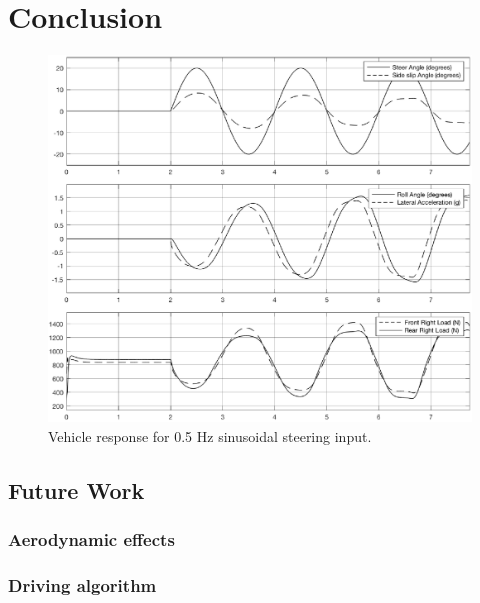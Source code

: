 \chapter{Conclusion}
\label{chap:conclusion}

\begin{figure}[ht]
  \centering
  \includegraphics[scale=0.8]{figures/sine}
  \caption{Vehicle response for 0.5 Hz sinusoidal steering input.}
  \label{sine}
\end{figure}
\section{Future Work}
\label{sec:future}
\subsection{Aerodynamic effects}
\subsection{Driving algorithm}
